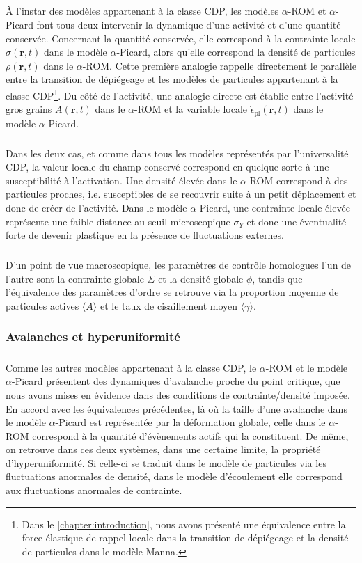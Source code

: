 \subparagraph{}\`A l'instar des modèles appartenant à la classe CDP, les modèles $\alpha$-ROM et $\alpha$-Picard font tous deux intervenir la dynamique d'une activité et d'une quantité conservée. Concernant la quantité conservée, elle correspond à la contrainte locale $\sigma(\mathbf{r},t)$ dans le modèle $\alpha$-Picard, alors qu'elle correspond la densité de particules $\rho(\mathbf{r}, t)$ dans le $\alpha$-ROM. Cette première analogie rappelle directement le parallèle entre la transition de dépiégeage et les modèles de particules appartenant à la classe CDP\footnote{Dans le \autoref{chapter:introduction}, nous avons présenté une équivalence entre la force élastique de rappel locale dans la transition de dépiégeage et la densité de particules dans le modèle Manna.}. Du côté de l'activité, une analogie directe est établie entre l'activité gros grains $A(\mathbf{r}, t)$ dans le $\alpha$-ROM et la variable locale $\dot{\epsilon}_\text{pl}(\mathbf{r}, t)$ dans le modèle $\alpha$-Picard.

\subparagraph{}Dans les deux cas, et comme dans tous les modèles représentés par l'universalité CDP, la valeur locale du champ conservé correspond en quelque sorte à une susceptibilité à l'activation. Une densité élevée dans le $\alpha$-ROM correspond à des particules proches, i.e. susceptibles de se recouvrir suite à un petit déplacement et donc de créer de l'activité. Dans le modèle $\alpha$-Picard, une contrainte locale élevée représente une faible distance au seuil microscopique $\sigma_Y$ et donc une éventualité forte de devenir plastique en la présence de fluctuations externes.

\subparagraph{}D'un point de vue macroscopique, les paramètres de contrôle homologues l'un de l'autre sont la contrainte globale $\Sigma$ et la densité globale $\phi$, tandis que l'équivalence des paramètres d'ordre se retrouve via la proportion moyenne de particules actives $\langle A \rangle $ et le taux de cisaillement moyen $\langle \dot{\gamma}\rangle$.

\subsubsection{Avalanches et hyperuniformité}

\subparagraph{}Comme les autres modèles appartenant à la classe CDP, le $\alpha$-ROM et le modèle $\alpha$-Picard présentent des dynamiques d'avalanche proche du point critique, que nous avons mises en évidence dans des conditions de contrainte/densité imposée. En accord avec les équivalences précédentes, là où la taille d'une avalanche dans le modèle $\alpha$-Picard est représentée par la déformation globale, celle dans le $\alpha$-ROM correspond à la quantité d'évènements actifs qui la constituent. De même, on retrouve dans ces deux systèmes, dans une certaine limite, la propriété d'hyperuniformité. Si celle-ci se traduit dans le modèle de particules via les fluctuations anormales de densité, dans le modèle d'écoulement elle correspond aux fluctuations anormales de contrainte.

